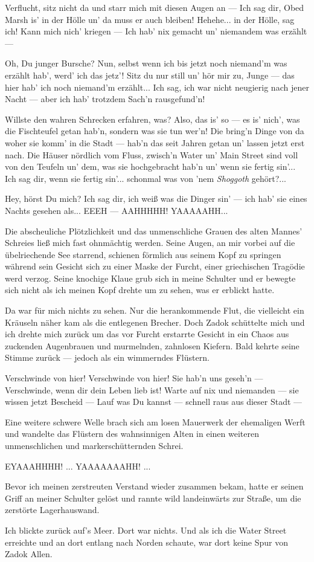 \glqq Verflucht, sitz nicht da und starr mich mit diesen Augen an --- Ich sag dir, Obed Marsh is' in der Hölle un' da muss er auch bleiben! Hehehe... in der Hölle, sag ich! Kann mich nich' kriegen --- Ich hab' nix gemacht un' niemandem was erzählt ---

Oh, Du junger Bursche? Nun, selbst wenn ich bis jetzt noch niemand'm was erzählt hab', werd' ich das jetz'! Sitz du nur still un' hör mir zu, Junge --- das hier hab' ich noch niemand'm erzählt... Ich sag, ich war nicht neugierig nach jener Nacht --- aber ich hab' trotzdem Sach'n rausgefund'n!

Willste den wahren Schrecken erfahren, was? Also, das is' so --- es is' nich', was die Fischteufel getan hab'n, sondern was sie tun wer'n! Die bring'n Dinge von da woher sie komm' in die  Stadt --- hab'n das seit Jahren getan un' lassen jetzt erst nach. Die Häuser nördlich vom Fluss, zwisch'n Water un' Main Street sind voll von den Teufeln un' dem, was sie hochgebracht hab'n un' wenn sie fertig sin'... Ich sag dir, wenn sie fertig sin'... schonmal was von 'nem \textit{Shoggoth} gehört?...

Hey, hörst Du mich? Ich sag dir, ich weiß was die Dinger sin' --- ich hab' sie eines Nachts gesehen als... EEEH --- AAHHHHH! YAAAAAHH...
\grqq

Die abscheuliche Plötzlichkeit und das unmenschliche Grauen des alten Mannes' Schreies ließ mich fast ohnmächtig werden. Seine Augen, an mir vorbei auf die übelriechende See starrend, schienen förmlich aus seinem Kopf zu springen während sein Gesicht sich zu einer Maske der Furcht, einer griechischen Tragödie werd verzog. Seine knochige Klaue grub sich in meine Schulter und er bewegte sich nicht als ich meinen Kopf drehte um zu sehen, was er erblickt hatte.

Da war für mich nichts zu sehen. Nur die herankommende Flut, die vielleicht ein Kräuseln näher kam als die entlegenen Brecher. Doch Zadok schüttelte mich und ich drehte mich zurück um das vor Furcht erstarrte Gesicht in ein Chaos aus zuckenden Augenbrauen und murmelnden, zahnlosen Kiefern. Bald kehrte seine Stimme zurück --- jedoch als ein wimmerndes Flüstern.

\glqq Verschwinde von hier! Verschwinde von hier! Sie hab'n uns geseh'n --- Verschwinde, wenn dir dein Leben lieb ist! Warte auf nix und niemanden --- sie wissen jetzt Bescheid --- Lauf was Du kannst --- schnell raus aus dieser Stadt ---
\grqq

Eine weitere schwere Welle brach sich am losen Mauerwerk der ehemaligen Werft und wandelte das Flüstern des wahnsinnigen Alten in einen weiteren unmenschlichen und markerschütternden Schrei.

\glqq EYAAAHHHH! ... YAAAAAAAHH! ...\grqq

Bevor ich meinen zerstreuten Verstand wieder zusammen bekam, hatte er seinen Griff an meiner Schulter gelöst und rannte wild landeinwärts zur Straße, um die zerstörte Lagerhauswand.

Ich blickte zurück auf's Meer. Dort war nichts. Und als ich die Water Street erreichte und an dort entlang nach Norden schaute, war dort keine Spur von Zadok Allen.
